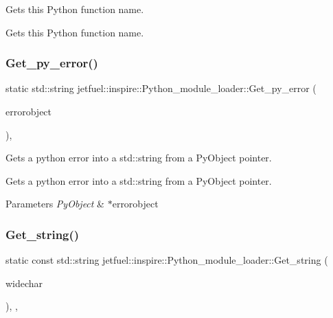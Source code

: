 Gets this Python function name. 

Gets this Python function name. \mbox{\label{classjetfuel_1_1inspire_1_1Python__module__loader_adb872547c2aec3b27e5845fedb7a3f42}} 
\subsubsection{\texorpdfstring{Get\+\_\+py\+\_\+error()}{Get\_py\_error()}}
{\footnotesize\ttfamily static std\+::string jetfuel\+::inspire\+::\+Python\+\_\+module\+\_\+loader\+::\+Get\+\_\+py\+\_\+error (\begin{DoxyParamCaption}\item[{Py\+Object $\ast$}]{errorobject }\end{DoxyParamCaption})\hspace{0.3cm}{\ttfamily [static]}, {\ttfamily [protected]}}



Gets a python error into a std\+::string from a Py\+Object pointer. 

Gets a python error into a std\+::string from a Py\+Object pointer.


\begin{DoxyParams}{Parameters}
{\em Py\+Object} & $\ast$errorobject \\
\hline
\end{DoxyParams}
\mbox{\label{classjetfuel_1_1inspire_1_1Python__module__loader_a88da3316adbe919080ad1c92045b4ad3}} 
\subsubsection{\texorpdfstring{Get\+\_\+string()}{Get\_string()}}
{\footnotesize\ttfamily static const std\+::string jetfuel\+::inspire\+::\+Python\+\_\+module\+\_\+loader\+::\+Get\+\_\+string (\begin{DoxyParamCaption}\item[{const wchar\+\_\+t $\ast$}]{widechar }\end{DoxyParamCaption})\hspace{0.3cm}{\ttfamily [inline]}, {\ttfamily [static]}, {\ttfamily [protected]}}



